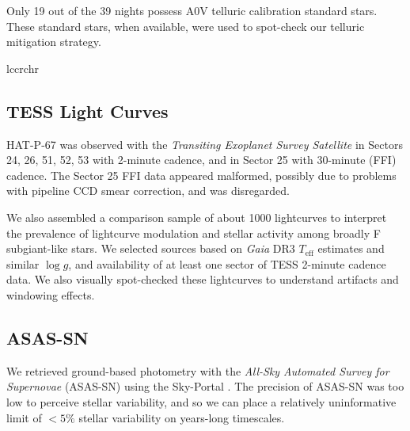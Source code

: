 \documentclass[twocolumn]{aastex631}
\begin{document}
Only 19 out of the 39 nights possess A0V telluric calibration standard stars.  These standard stars, when available, were used to spot-check our telluric mitigation strategy.


\begin{deluxetable}{lccrchr}
    \tablewidth{0pc}
    \tabletypesize{\scriptsize}
    \startdata
    
    \enddata
\end{deluxetable}

\subsection{TESS Light Curves}
HAT-P-67 was observed with the \emph{Transiting Exoplanet Survey Satellite} \citep[TESS,][]{2014SPIE.9143E..20R} in Sectors 24, 26, 51, 52, 53 with 2-minute cadence, and in Sector 25 with 30-minute (FFI) cadence.  The Sector 25 FFI data appeared malformed, possibly due to problems with pipeline CCD smear correction, and was disregarded.

We also assembled a comparison sample of about 1000 lightcurves to interpret the  prevalence of lightcurve modulation and stellar activity among broadly F subgiant-like stars.  We selected sources based on \emph{Gaia} DR3 $T_\mathrm{eff}$ estimates and similar $\log{g}$,  and availability of at least one sector of TESS 2-minute cadence data.  We also visually spot-checked these lightcurves to understand artifacts and windowing effects.

\subsection{ASAS-SN}
We retrieved ground-based photometry with the \emph{All-Sky Automated Survey for Supernovae} (ASAS-SN) using the Sky-Portal \citep{shappee14,2017PASP..129j4502K}.  The precision of ASAS-SN was too low to perceive stellar variability, and so we can place a relatively uninformative limit of $<5\%$ stellar variability on years-long timescales.
\end{document}
